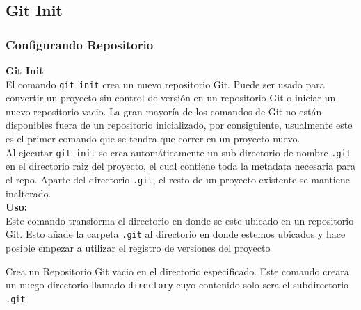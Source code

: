 \documentclass[8pt]{beamer}
\begin{document}
\subsection{Git Init} 
\begin{frame}
\frametitle{Configurando Repositorio}
\textbf{Git Init}\\
El comando \texttt{git init} crea un nuevo repositorio Git. Puede ser usado para convertir un proyecto sin control de versi\'on en un repositorio Git o iniciar un nuevo repositorio vacio. La gran mayor\'ia de los comandos de Git no est\'an disponibles fuera de un repositorio inicializado, por consiguiente, usualmente este es el primer comando que se tendra que correr en un proyecto nuevo.\\
Al ejecutar \texttt{git init} se crea autom\'aticamente un sub-directorio de nombre \texttt{.git} en el directorio raiz del proyecto, el cual contiene toda la metadata necesaria para el repo. Aparte del directorio \texttt{.git}, el resto de un proyecto existente se mantiene inalterado.\\
\medskip
\textbf{Uso:}\\

Este comando transforma el directorio en donde se este ubicado en un repositorio Git. Esto añade la carpeta \texttt{.git} al directorio en donde estemos ubicados y hace posible empezar a utilizar el registro de versiones del proyecto

Crea un Repositorio Git vacio en el directorio especificado. Este comando creara un nuego directorio llamado \texttt{directory} cuyo contenido solo sera el subdirectorio \texttt{.git}
\end{frame}
\end{document}
